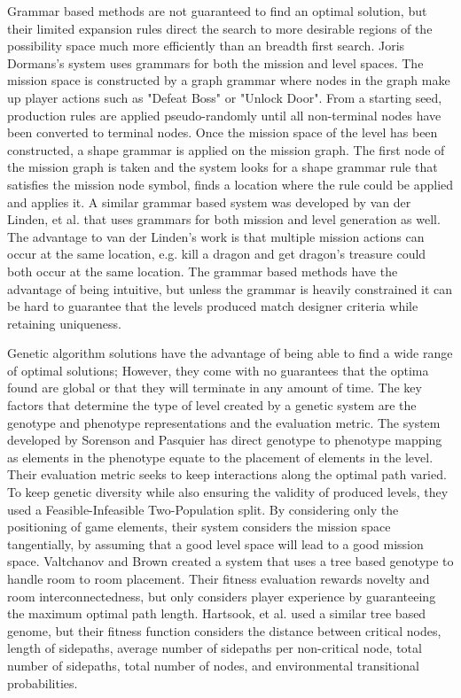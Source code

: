 \documentclass[12pt]{report}
\begin{document}
Grammar based methods are not guaranteed to find an optimal solution, but their limited expansion rules direct the search to more desirable regions of the possibility space much more efficiently than an breadth first search.  Joris Dormans's system \cite{JDADVENTURE} uses grammars for both the mission and level spaces.  The mission space is constructed 
by a graph grammar where nodes in the graph make up player actions such as "Defeat Boss" or "Unlock Door".  From a starting seed, production rules are applied pseudo-randomly until all non-terminal nodes have been converted to terminal nodes. Once the mission space of the level has been constructed, a shape grammar is applied on the mission graph.  The first node of the mission graph is taken and the system looks for a shape grammar rule that satisfies the mission node symbol, finds a location where the rule could be applied and applies it. A similar grammar based system was developed by van der Linden, et al. \cite{VDLPROCGENLEVEL}  that uses grammars for both mission and level generation as well.  The advantage to van der Linden's work is that multiple mission actions can occur at the same location, e.g. kill a dragon and get dragon's treasure could both occur at the same location.  The grammar based methods have the advantage of being intuitive, but unless the grammar is heavily constrained it can be hard to guarantee that the levels produced match designer criteria while retaining uniqueness.  

Genetic algorithm solutions have the advantage of being able to find a wide range of optimal solutions; However, they come with no guarantees that the optima found are global or that they will terminate in any amount of time.  The key factors that determine the type of level created by a genetic system are the genotype and phenotype representations and the evaluation metric. The system developed by Sorenson and Pasquier \cite{SORPASLEVEL} has direct genotype to phenotype mapping as elements in the phenotype equate to the placement of elements in the level. Their evaluation metric seeks to keep interactions along the optimal path varied.  To keep genetic diversity while also ensuring the validity of produced levels, they used a Feasible-Infeasible Two-Population split.  By considering only the positioning of game elements, their system considers the mission space tangentially, by assuming that a good level space will lead to a good mission space. Valtchanov and Brown \cite{VALTCHANOVEVOLVE} 
created a system that uses a tree based genotype to handle room to room placement.  Their fitness evaluation rewards novelty and room interconnectedness, but only considers player experience by guaranteeing the maximum optimal path length.  Hartsook, et al. \cite{hartsook} used a similar tree based genome, but their fitness function considers the distance between critical nodes, 
length of sidepaths, average number of sidepaths per non-critical node, total 
number of sidepaths, total number of nodes, and environmental transitional probabilities.  
\end{document}
